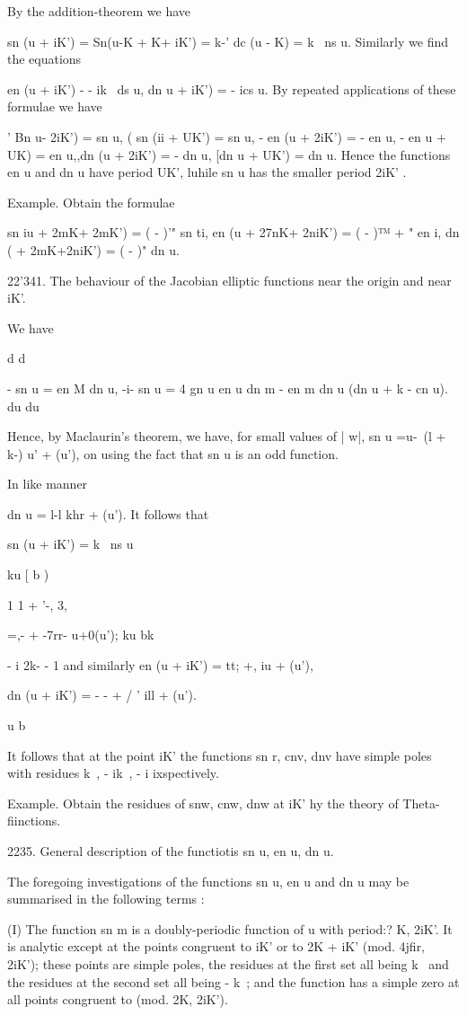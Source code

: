 By the addition-theorem we have

sn (u + iK') = Sn(u-K + K+ iK') = k-' dc (u - K) = k~ ns u. Similarly
we find the equations

en (u + iK') - - ik~ ds u, dn u + iK') = - ics u. By repeated
applications of these formulae we have

' Bn u- 2iK') = sn u, ( sn (ii + UK') = sn u, - en (u + 2iK') = - en
u, - en u + UK) = en u,,dn (u + 2iK') = - dn u, [dn u + UK') = dn u.
Hence the functions en u and dn u have period UK', luhile sn u has the
smaller period 2iK' .

Example. Obtain the formulae

sn iu + 2mK+ 2mK') = ( - )'" sn ti, en (u + 27nK+ 2niK') = ( - )™ + "
en i, dn ( + 2mK+2niK') = ( - )" dn u.

22'341. The behaviour of the Jacobian elliptic functions near the
origin and near iK'.

We have

d d

- sn u = en M dn u, -i- sn u = 4 gn u en u dn m - en m dn u (dn u + k
- cn u). du du

%
%

Hence, by Maclaurin's theorem, we have, for small values of | w|, sn u
=u-~(l + k-) u' + (u'), on using the fact that sn u is an odd
function.

In like manner

dn u = l-l khr + (u'). It follows that

sn (u + iK') = k~ ns u

ku [ b )

1 1 + '-, 3,

=,- + -7rr- u+0(u'); ku bk

- i 2k- - 1 and similarly en (u + iK') = tt; +, iu + (u'),

dn (u + iK') = - - + / ' ill + (u').

u b

It follows that at the point iK' the functions sn r, cnv, dnv have
simple poles with residues k~, - ik~, - i ixspectively.

Example. Obtain the residues of snw, cnw, dnw at iK' hy the theory of
Theta- fiinctions.

2235. General description of the functiotis sn u, en u, dn u.

The foregoing investigations of the functions sn u, en u and dn u may
be summarised in the following terms :

(I) The function sn m is a doubly-periodic function of u with period:?
K, 2iK'. It is analytic except at the points congruent to iK' or to 2K
+ iK' (mod. 4jfir, 2iK'); these points are simple poles, the residues
at the first set all being k~ and the residues at the second set all
being - k~; and the function has a simple zero at all points
congruent to (mod. 2K, 2iK').

